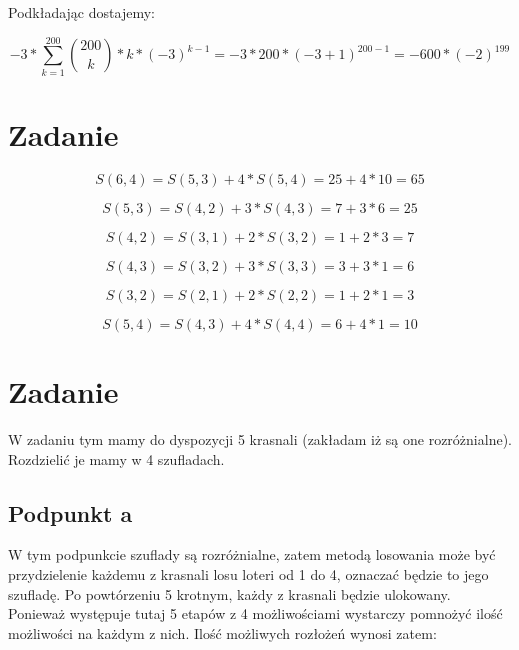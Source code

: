 \documentclass[paper=a4, fontsize=11pt]{scrartcl} %
\numberwithin{equation}{section} %
\numberwithin{figure}{section} %
\numberwithin{table}{section} %
\begin{document}
Podkładając dostajemy:

\begin{equation}
  -3 * \sum_{k=1}^{200}{200 \choose k} * k * (-3)^{k - 1} = -3 * 200 * (-3 + 1)^{200 - 1} = -600 * (-2)^{199}
\end{equation}



\newpage
\section{Zadanie}

\begin{equation}
  \nonumber
  S(6,4) = S(5,3) + 4 * S(5,4) = 25 + 4 * 10 = 65
\end{equation}

\begin{equation}
  \nonumber
  S(5,3) = S(4,2) + 3 * S(4,3) = 7 + 3 * 6 = 25 
\end{equation}

\begin{equation}
  \nonumber
  S(4,2) = S(3,1) + 2 * S(3,2) = 1 + 2 * 3 = 7
\end{equation}

\begin{equation}
  \nonumber
  S(4,3) = S(3,2) + 3 * S(3,3) = 3 + 3 * 1 = 6 
\end{equation}

\begin{equation}
  \nonumber
  S(3,2) = S(2,1) + 2 * S(2,2) = 1 + 2 * 1 = 3 
\end{equation}

\begin{equation}
  \nonumber
  S(5,4) = S(4,3) + 4 * S(4,4) = 6 + 4 * 1 = 10
\end{equation}


\newpage
\section{Zadanie}
W zadaniu tym mamy do dyspozycji 5 krasnali (zakładam iż są one rozróżnialne).
Rozdzielić je mamy w 4 szufladach.

\subsection{Podpunkt a}
W tym podpunkcie szuflady są rozróżnialne, zatem metodą losowania może być przydzielenie każdemu z 
krasnali losu loteri od 1 do 4, oznaczać będzie to jego szufladę. Po powtórzeniu 5 krotnym, każdy z krasnali
będzie ulokowany.
Ponieważ występuje tutaj 5 etapów z 4 możliwościami wystarczy pomnożyć ilość możliwości na każdym z nich.
Ilość możliwych rozłożeń wynosi zatem:
\end{document}
